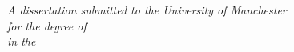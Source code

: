 \documentclass[
11pt, %
english, %
onehalfspacing, %
toctotoc, %
headsepline, %
twoside,
]{MastersDoctoralThesis} %
\begin{document}
\begin{titlepage}
\begin{center}
\vfill

\large \textit{A dissertation submitted to the University of Manchester\\ for the degree of \degreename}\\[0.3cm] %
\textit{in the}\\[0.4cm]
\deptname\\\facname\\[2cm] %
 
\vfill

{\large {\the\year}}\\[4cm] %
 
\vfill

\end{center}
\end{titlepage}


\tableofcontents %

\listoffigures %


\end{document}
